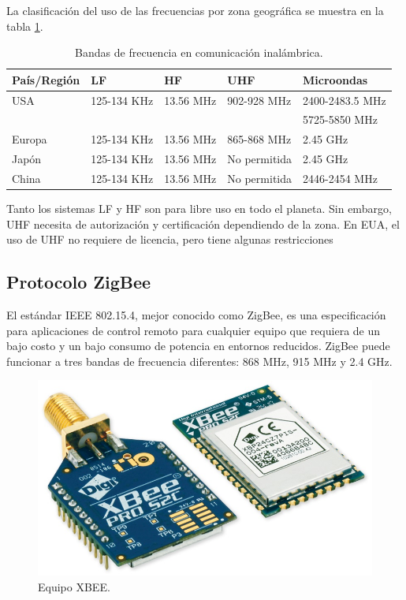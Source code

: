 La clasificación del uso de las frecuencias por zona geográfica se muestra en la tabla \ref{Tab:BandasFreq}.

\begin{table}[!htb]
\begin{center}
\caption{Bandas de frecuencia en comunicación inalámbrica.}
\label{Tab:BandasFreq}
\begin{tabular}{|l|l|l|l|l|}
	\hline
	\textbf{País/Región} & \textbf{LF} & \textbf{HF} & \textbf{UHF} & \textbf{Microondas}\\
	\hline
	USA & 125-134 KHz & 13.56 MHz & 902-928 MHz & 2400-2483.5 MHz\\& & & & 5725-5850 MHz \\
	\hline
	Europa & 125-134 KHz & 13.56 MHz & 865-868 MHz & 2.45 GHz \\
	\hline
	Japón & 125-134 KHz & 13.56 MHz & No permitida & 2.45 GHz \\
	\hline
	China & 125-134 KHz & 13.56 MHz & No permitida & 2446-2454 MHz \\
	\hline
\end{tabular}
\end{center}
\end{table}

Tanto los sistemas LF y HF son para libre uso en todo el planeta. Sin embargo, UHF necesita de autorización y certificación dependiendo de la zona. En EUA, el uso de UHF no requiere de licencia, pero tiene algunas restricciones \cite{tapia2007identificacion}

\subsection{Protocolo ZigBee}

El estándar IEEE 802.15.4, mejor conocido como ZigBee, es una especificación para aplicaciones de control remoto para cualquier equipo que requiera de un bajo costo y un bajo consumo de potencia en entornos reducidos. ZigBee puede funcionar a tres bandas de frecuencia diferentes: 868 MHz, 915 MHz y 2.4 GHz. \\

\begin{figure}[ht]
\centering
\includegraphics[scale=0.20]{Figures/xbee}
\caption[Equipo XBEE.]{Equipo XBEE.}
\label{fig:XBEE}
\end{figure}

